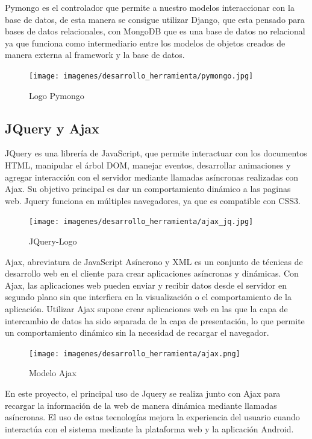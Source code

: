 \documentclass[a4paper,11pt]{book}
\begin{document}
Pymongo es el controlador que permite a nuestro modelos interaccionar con la base de datos, de esta manera se consigue utilizar Django, que esta pensado para bases de datos relacionales, con MongoDB que es una base de datos no relacional ya que funciona como intermediario entre los modelos de objetos creados de manera externa al framework y la base de datos.

\begin{figure}[H] 
\centering 
\texttt{[image: imagenes/desarrollo\_herramienta/pymongo.jpg]}
\caption{ Logo Pymongo\cite{pymongoL}}  
\end{figure} 

 

\subsection{JQuery y Ajax}

JQuery\cite{jq} es una librería de JavaScript, que permite interactuar con los documentos HTML, manipular el árbol DOM, manejar eventos, desarrollar animaciones y agregar interacción con el servidor mediante llamadas asíncronas realizadas con Ajax. Su objetivo principal es dar un comportamiento dinámico a las paginas web. Jquery funciona en múltiples navegadores, ya que es compatible con CSS3.

\begin{figure}[H] 
\centering 
\texttt{[image: imagenes/desarrollo\_herramienta/ajax\_jq.jpg]}
\caption{ JQuery-Logo\cite{jq2}  }  
\end{figure}   

Ajax\cite{aj}, abreviatura de JavaScript Asíncrono y XML es un conjunto de técnicas de desarrollo web en el cliente para crear aplicaciones asíncronas y dinámicas. Con Ajax, las aplicaciones web pueden enviar y recibir datos desde el servidor en segundo plano sin que interfiera en la visualización o el comportamiento de la aplicación. Utilizar Ajax supone crear aplicaciones web en las que la capa de intercambio de datos ha sido separada de la capa de presentación, lo que permite un comportamiento dinámico sin la necesidad de recargar el navegador. 

\begin{figure}[H] 
\centering 
\texttt{[image: imagenes/desarrollo\_herramienta/ajax.png]}
\caption{ Modelo Ajax\cite{aj2}  }  
\end{figure}   

En este proyecto, el principal uso de Jquery se realiza junto con Ajax para recargar la información de la web de manera dinámica mediante llamadas asíncronas. El uso de estas tecnologías mejora la experiencia del usuario cuando interactúa con el sistema mediante la plataforma web y la aplicación Android.
\end{document}
